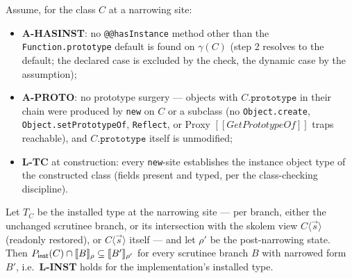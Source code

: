 \documentclass[11pt]{article}
\newcommand{\realize}{\gamma}
\newcommand{\intm}[1]{[[#1]]}
\begin{document}
\begin{theorem}
\label{thm:inst}
Assume, for the class $C$ at a narrowing site:
\begin{itemize}
\item \textbf{A-HASINST}: no \texttt{@@hasInstance} method other than
  the \texttt{Function.prototype} default is found on
  $\realize(C)$ (step 2 resolves to the default; the declared case is
  excluded by the check, the dynamic case by the assumption);
\item \textbf{A-PROTO}: no prototype surgery — objects with
  $C.\texttt{prototype}$ in their chain were produced by \texttt{new} on
  $C$ or a subclass (no \texttt{Object.create},
  \texttt{Object.setPrototypeOf}, \texttt{Reflect}, or Proxy
  $\intm{GetPrototypeOf}$ traps reachable), and
  $C.\texttt{prototype}$ itself is unmodified;
\item \textbf{L-TC} at construction: every \texttt{new}-site
  establishes the instance object type of the constructed class
  (fields present and typed, per the class-checking discipline).
\end{itemize}
Let $T_C$ be the installed type at the narrowing site — per branch,
either the unchanged scrutinee branch, or its intersection with the
skolem view $C\langle \vec s \rangle$ (readonly restored), or
$C\langle \vec s \rangle$ itself — and let $\rho'$ be the
post-narrowing state. Then
$P_{\mathsf{inst}}(C) \cap \llbracket B \rrbracket_{\rho} \subseteq \llbracket B' \rrbracket_{\rho'}$
for every scrutinee branch $B$ with narrowed form $B'$, i.e.\
\textbf{L-INST} holds for the implementation's installed type.
\end{theorem}
\end{document}
